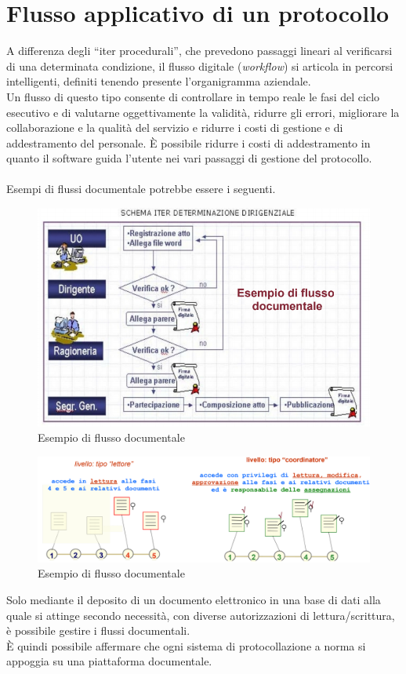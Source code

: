 \section{Flusso applicativo di un protocollo}
A differenza degli “iter procedurali”, che prevedono passaggi lineari al verificarsi di una determinata condizione, il flusso digitale (\emph{workflow}\glsfirstoccur) si articola in percorsi intelligenti, definiti tenendo presente l’organigramma aziendale.
\\
Un flusso di questo tipo consente di controllare in tempo reale le fasi del ciclo esecutivo e di valutarne oggettivamente la validità, ridurre gli errori, migliorare la collaborazione e la qualità del servizio e ridurre i costi di gestione e di addestramento del personale. È possibile ridurre i costi di addestramento in quanto il software guida l'utente nei vari passaggi di gestione del protocollo.
\\
\\
Esempi di flussi documentale potrebbe essere i seguenti.
\begin{figure}[!h] 
    \centering 
    \includegraphics[width=1\columnwidth]{immagini/flussi/Flusso1.png} 
    \caption{Esempio di flusso documentale}
\end{figure}
\begin{figure}[!h] 
    \centering 
    \includegraphics[width=1\columnwidth]{immagini/flussi/flusso2.png} 
    \caption{Esempio di flusso documentale}
\end{figure}
\newpage

Solo mediante il deposito di un documento elettronico in una base di dati alla
quale si attinge secondo necessità, con diverse autorizzazioni di
lettura/scrittura, è possibile gestire i flussi documentali.
\\
È quindi possibile affermare che ogni sistema di protocollazione a norma si appoggia su una piattaforma documentale.
